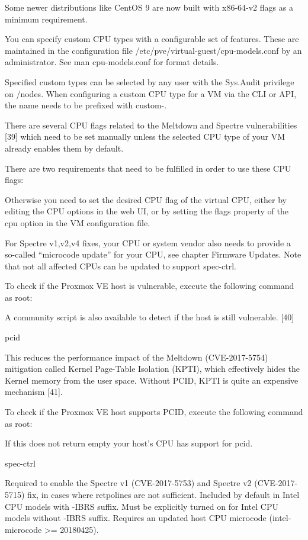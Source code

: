 Some newer distributions like CentOS 9 are now built with x86-64-v2 flags as a minimum requirement.

You can specify custom CPU types with a configurable set of features. These are maintained in the configuration file /etc/pve/virtual-guest/cpu-models.conf by an administrator. See man cpu-models.conf for format details.

Specified custom types can be selected by any user with the Sys.Audit privilege on /nodes. When configuring a custom CPU type for a VM via the CLI or API, the name needs to be prefixed with custom-.

There are several CPU flags related to the Meltdown and Spectre vulnerabilities [39] which need to be set manually unless the selected CPU type of your VM already enables them by default.

There are two requirements that need to be fulfilled in order to use these CPU flags:

Otherwise you need to set the desired CPU flag of the virtual CPU, either by editing the CPU options in the web UI, or by setting the flags property of the cpu option in the VM configuration file.

For Spectre v1,v2,v4 fixes, your CPU or system vendor also needs to provide a so-called “microcode update” for your CPU, see chapter Firmware Updates. Note that not all affected CPUs can be updated to support spec-ctrl.

To check if the Proxmox VE host is vulnerable, execute the following command as root:

A community script is also available to detect if the host is still vulnerable. [40]

pcid

This reduces the performance impact of the Meltdown (CVE-2017-5754) mitigation called Kernel Page-Table Isolation (KPTI), which effectively hides the Kernel memory from the user space. Without PCID, KPTI is quite an expensive mechanism [41].

To check if the Proxmox VE host supports PCID, execute the following command as root:

If this does not return empty your host’s CPU has support for pcid.

spec-ctrl

Required to enable the Spectre v1 (CVE-2017-5753) and Spectre v2 (CVE-2017-5715) fix, in cases where retpolines are not sufficient. Included by default in Intel CPU models with -IBRS suffix. Must be explicitly turned on for Intel CPU models without -IBRS suffix. Requires an updated host CPU microcode (intel-microcode >= 20180425).

